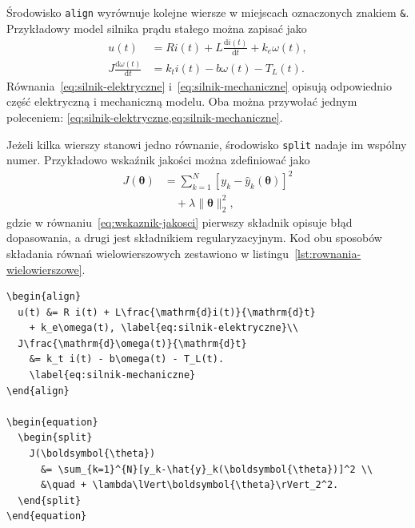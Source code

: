 \section{}

Środowisko \texttt{align} wyrównuje kolejne wiersze w miejscach oznaczonych znakiem
\verb|&|. Przykładowy model silnika prądu stałego można zapisać jako
\begin{align}
  u(t) &= R i(t) + L\frac{\mathrm{d}i(t)}{\mathrm{d}t} + k_e\omega(t),
    \label{eq:silnik-elektryczne}\\
  J\frac{\mathrm{d}\omega(t)}{\mathrm{d}t}
    &= k_t i(t) - b\omega(t) - T_L(t).
    \label{eq:silnik-mechaniczne}
\end{align}
Równania~\ref{eq:silnik-elektryczne} i~\ref{eq:silnik-mechaniczne} opisują odpowiednio
część elektryczną i mechaniczną modelu. Oba można przywołać jednym poleceniem:
\cref{eq:silnik-elektryczne,eq:silnik-mechaniczne}.

Jeżeli kilka wierszy stanowi jedno równanie, środowisko \texttt{split} nadaje im wspólny
numer. Przykładowo wskaźnik jakości można zdefiniować jako
\begin{equation}
  \begin{split}
    J(\boldsymbol{\theta})
      &= \sum_{k=1}^{N}\left[y_k-\hat{y}_k(\boldsymbol{\theta})\right]^2 \\
      &\quad + \lambda\lVert\boldsymbol{\theta}\rVert_2^2,
  \end{split}
  \label{eq:wskaznik-jakosci}
\end{equation}
gdzie w równaniu~\ref{eq:wskaznik-jakosci} pierwszy składnik opisuje błąd dopasowania, a drugi jest składnikiem
regularyzacyjnym. Kod obu sposobów składania równań wielowierszowych zestawiono
w listingu~\ref{lst:rownania-wielowierszowe}.

\begin{lstlisting}[style=thesis,caption={Kod równań wielowierszowych},label={lst:rownania-wielowierszowe}]
\begin{align}
  u(t) &= R i(t) + L\frac{\mathrm{d}i(t)}{\mathrm{d}t}
    + k_e\omega(t), \label{eq:silnik-elektryczne}\\
  J\frac{\mathrm{d}\omega(t)}{\mathrm{d}t}
    &= k_t i(t) - b\omega(t) - T_L(t).
    \label{eq:silnik-mechaniczne}
\end{align}

\begin{equation}
  \begin{split}
    J(\boldsymbol{\theta})
      &= \sum_{k=1}^{N}[y_k-\hat{y}_k(\boldsymbol{\theta})]^2 \\
      &\quad + \lambda\lVert\boldsymbol{\theta}\rVert_2^2.
  \end{split}
\end{equation}
\end{lstlisting}

